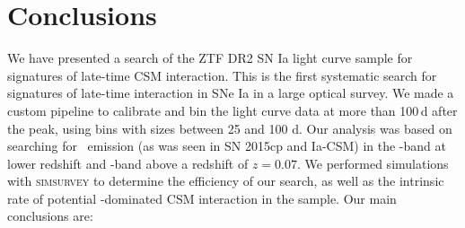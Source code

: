 \documentclass[a4paper,oneside,12pt, class=Latex/Classes/PhDthesisPSnPDF, crop=false]{standalone}
\begin{document}
\section{Conclusions}
\label{conclusion}
We have presented a search of the ZTF DR2 SN Ia light curve sample for signatures of late-time CSM interaction. This is the first systematic search for signatures of late-time interaction in SNe Ia in a large optical survey. We made a custom pipeline to calibrate and bin the light curve data at more than 100\,d after the peak, using bins with sizes between 25 and 100 d. Our analysis was based on searching for \Halpha~emission (as was seen in SN 2015cp and Ia-CSM) in the \ztfr-band at lower redshift and \ztfi-band above a redshift of $z = 0.07$. We performed simulations with \textsc{simsurvey} to determine the efficiency of our search, as well as the intrinsic rate of potential \Halpha-dominated CSM interaction in the sample. Our main conclusions are:
\end{document}
